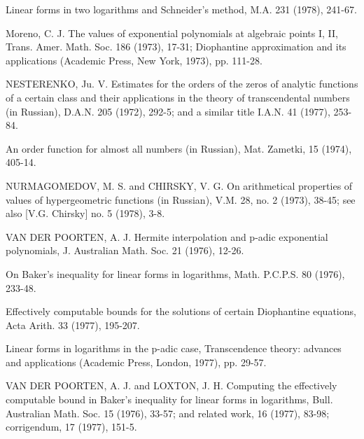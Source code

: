 \begin{hanglist}
    \item \hspace{1.5em} Linear forms in two logarithms and Schneider's method, M.A. 231 (1978), 241-67.
    \item Moreno, C. J. The values of exponential polynomials at algebraic points I, II, Trans. Amer. Math. Soc. 186 (1973), 17-31; Diophantine approximation and its applications (Academic Press, New York, 1973), pp. 111-28.
    \item NESTERENKO, Ju. V. Estimates for the orders of the zeros of analytic functions of a certain class and their applications in the theory of transcendental numbers (in Russian), D.A.N. 205 (1972), 292-5; and a similar title I.A.N. 41 (1977), 253-84.
    \item \hspace{1.5em} An order function for almost all numbers (in Russian), Mat. Zametki, 15 (1974), 405-14.
    \item NURMAGOMEDOV, M. S. and CHIRSKY, V. G. On arithmetical properties of values of hypergeometric functions (in Russian), V.M. 28, no. 2 (1973), 38-45; see also [V.G. Chirsky] no. 5 (1978), 3-8.
    \item VAN DER POORTEN, A. J. Hermite interpolation and p-adic exponential polynomials, J. Australian Math. Soc. 21 (1976), 12-26.
    \item \hspace{1.5em} On Baker's inequality for linear forms in logarithms, Math. P.C.P.S. 80 (1976), 233-48.
    \item \hspace{1.5em} Effectively computable bounds for the solutions of certain Diophantine equations, Acta Arith. 33 (1977), 195-207.
    \item \hspace{1.5em} Linear forms in logarithms in the p-adic case, Transcendence theory: advances and applications (Academic Press, London, 1977), pp. 29-57.
    \item VAN DER POORTEN, A. J. and LOXTON, J. H. Computing the effectively computable bound in Baker's inequality for linear forms in logarithms, Bull. Australian Math. Soc. 15 (1976), 33-57; and related work, 16 (1977), 83-98; corrigendum, 17 (1977), 151-5.

\end{hanglist}
